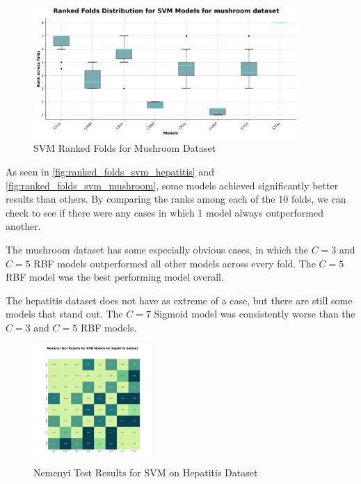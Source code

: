 \begin{figure}
    \centering
    \includegraphics[width=0.9\textwidth]{figures/ranked_folds_SVM_mushroom.png}
    \caption{SVM Ranked Folds for Mushroom Dataset}
    \label{fig:ranked_folds_svm_mushroom}
\end{figure}

As seen in \autoref{fig:ranked_folds_svm_hepatitis} and \autoref{fig:ranked_folds_svm_mushroom},
some models achieved significantly better results than others. By comparing the ranks among each of the 10 folds,
we can check to see if there were any cases in which 1 model always outperformed another.

The mushroom dataset has some especially obvious cases, in which the $C=3$ and $C=5$ RBF models
outperformed all other models across every fold. The $C=5$ RBF model was the best performing model overall.

The hepatitis dataset does not have as extreme of a case, but there are still some models that stand out.
The $C=7$ Sigmoid model was consistently worse than the $C=3$ and $C=5$ RBF models.

\begin{figure}
    \centering
    \includegraphics[width=0.4\textwidth]{figures/nemenyi_test_results_SVM_hepatitis.png}
    \caption{Nemenyi Test Results for SVM on Hepatitis Dataset}
    \label{fig:nemenyi_test_results_SVM_hepatitis}
\end{figure}

